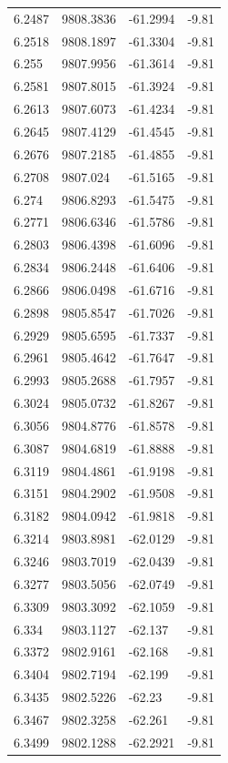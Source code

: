 \begin{table}[H]
\begin{tabular}{llll}
6.2487 & 9808.3836 & -61.2994 & -9.81 \\
6.2518 & 9808.1897 & -61.3304 & -9.81 \\
6.255 & 9807.9956 & -61.3614 & -9.81 \\
6.2581 & 9807.8015 & -61.3924 & -9.81 \\
6.2613 & 9807.6073 & -61.4234 & -9.81 \\
6.2645 & 9807.4129 & -61.4545 & -9.81 \\
6.2676 & 9807.2185 & -61.4855 & -9.81 \\
6.2708 & 9807.024 & -61.5165 & -9.81 \\
6.274 & 9806.8293 & -61.5475 & -9.81 \\
6.2771 & 9806.6346 & -61.5786 & -9.81 \\
6.2803 & 9806.4398 & -61.6096 & -9.81 \\
6.2834 & 9806.2448 & -61.6406 & -9.81 \\
6.2866 & 9806.0498 & -61.6716 & -9.81 \\
6.2898 & 9805.8547 & -61.7026 & -9.81 \\
6.2929 & 9805.6595 & -61.7337 & -9.81 \\
6.2961 & 9805.4642 & -61.7647 & -9.81 \\
6.2993 & 9805.2688 & -61.7957 & -9.81 \\
6.3024 & 9805.0732 & -61.8267 & -9.81 \\
6.3056 & 9804.8776 & -61.8578 & -9.81 \\
6.3087 & 9804.6819 & -61.8888 & -9.81 \\
6.3119 & 9804.4861 & -61.9198 & -9.81 \\
6.3151 & 9804.2902 & -61.9508 & -9.81 \\
6.3182 & 9804.0942 & -61.9818 & -9.81 \\
6.3214 & 9803.8981 & -62.0129 & -9.81 \\
6.3246 & 9803.7019 & -62.0439 & -9.81 \\
6.3277 & 9803.5056 & -62.0749 & -9.81 \\
6.3309 & 9803.3092 & -62.1059 & -9.81 \\
6.334 & 9803.1127 & -62.137 & -9.81 \\
6.3372 & 9802.9161 & -62.168 & -9.81 \\
6.3404 & 9802.7194 & -62.199 & -9.81 \\
6.3435 & 9802.5226 & -62.23 & -9.81 \\
6.3467 & 9802.3258 & -62.261 & -9.81 \\
6.3499 & 9802.1288 & -62.2921 & -9.81 \\

\end{tabular}
\end{table}
